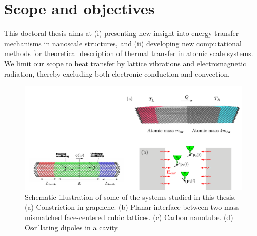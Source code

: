 \section{Scope and objectives}
This doctoral thesis aims at (i) presenting new insight into energy transfer mechanisms in nanoscale structures, and (ii) developing new computational methods for theoretical description of thermal transfer in atomic scale systems. We limit our scope to heat transfer by lattice vibrations and electromagnetic radiation, thereby excluding both electronic conduction and convection.


\begin{figure}
\begin{center}
 \includegraphics[width=.99\columnwidth]{pics/systems.pdf}
 \caption{Schematic illustration of some of the systems studied in this thesis. (a) Constriction in graphene. (b) Planar interface between two mass-mismatched face-centered cubic lattices. (c) Carbon nanotube. (d) Oscillating dipoles in a cavity.}
\label{fig:intro_systems}
\end{center}
\end{figure}

